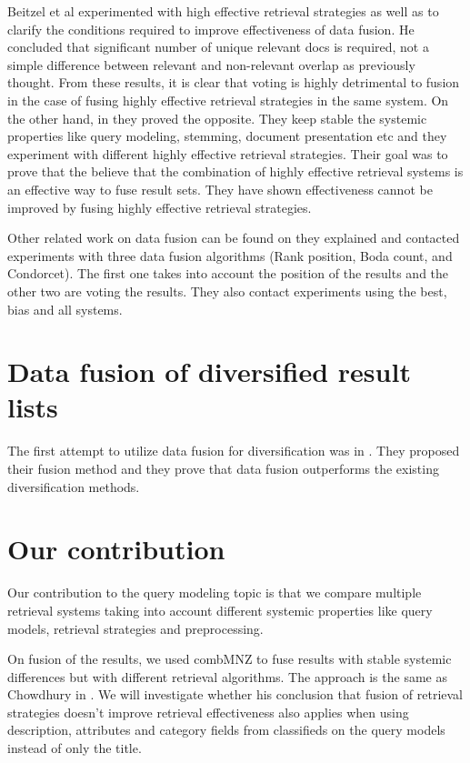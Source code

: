 Beitzel et al \cite{Beitzel} experimented with high effective retrieval strategies as well as to clarify the conditions required to improve effectiveness of data fusion. He concluded that significant number of unique relevant docs is required, not a simple difference between relevant and non-relevant overlap as previously thought. From these results, it is clear that voting is highly detrimental to fusion in the case of fusing highly effective retrieval strategies in the same system. On the other hand, in \cite{Beitzel04} they proved the opposite. They keep stable the systemic properties like query modeling, stemming, document presentation etc and they experiment with different highly effective retrieval strategies. Their goal was to prove that the believe that the combination of highly effective retrieval systems is an effective way to fuse result sets. They have shown effectiveness cannot be improved by fusing highly effective retrieval strategies.

Other related work on data fusion can be found on \cite{NurayCan} they explained and contacted experiments with three data fusion algorithms (Rank position, Boda count, and Condorcet). The first one takes into account the position of the results and the other two are voting the results. They also contact experiments using the best, bias and all systems.

\section{Data fusion of diversified result lists}

The first attempt to utilize data fusion for diversification was in \cite{LiangRenMaarten}. They proposed their fusion method and they prove that data fusion outperforms the existing diversification methods.

\section{Our contribution}
Our contribution to the query modeling topic is that we compare multiple retrieval systems taking into account different systemic properties like query models, retrieval strategies and preprocessing.

On fusion of the results, we used combMNZ to fuse results with stable systemic differences but with different retrieval algorithms. The approach is the same as Chowdhury in \cite{Chowdhury}. We will investigate whether his conclusion that fusion of retrieval strategies doesn't improve retrieval effectiveness also applies when using description, attributes and category fields from classifieds on the query models instead of only the title.

